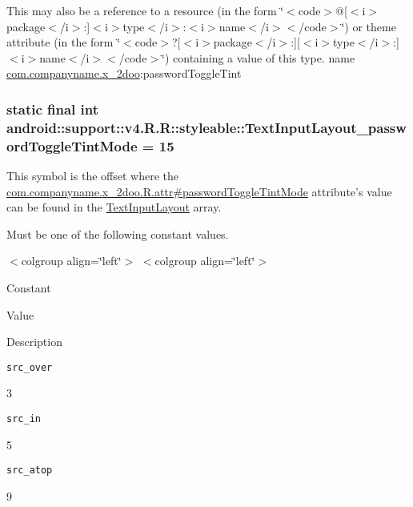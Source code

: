 This may also be a reference to a resource (in the form \char`\"{}$<$code$>$@\mbox{[}$<$i$>$package$<$/i$>$:\mbox{]}$<$i$>$type$<$/i$>$:$<$i$>$name$<$/i$>$$<$/code$>$\char`\"{}) or theme attribute (in the form \char`\"{}$<$code$>$?\mbox{[}$<$i$>$package$<$/i$>$:\mbox{]}\mbox{[}$<$i$>$type$<$/i$>$:\mbox{]}$<$i$>$name$<$/i$>$$<$/code$>$\char`\"{}) containing a value of this type.  name \hyperlink{namespacecom_1_1companyname_1_1x__2doo}{com.companyname.x\_\-2doo}:passwordToggleTint \hypertarget{classandroid_1_1support_1_1v4_1_1_r_1_1styleable_d9463181356179330f3502a4a7936e5a}{
\subsubsection[{TextInputLayout\_\-passwordToggleTintMode}]{\setlength{\rightskip}{0pt plus 5cm}static final int android::support::v4.R.R::styleable::TextInputLayout\_\-passwordToggleTintMode = 15}}
\label{classandroid_1_1support_1_1v4_1_1_r_1_1styleable_d9463181356179330f3502a4a7936e5a}


This symbol is the offset where the \hyperlink{classcom_1_1companyname_1_1x__2doo_1_1_r_1_1attr_930a88adb866b21f54f34838092a7d4f}{com.companyname.x\_\-2doo.R.attr\#passwordToggleTintMode} attribute's value can be found in the \hyperlink{classandroid_1_1support_1_1v4_1_1_r_1_1styleable_880beb171ce483ab1b63a82ef7f9d976}{TextInputLayout} array.

Must be one of the following constant values. \begin{TabularC}{0}
\hline
\end{TabularC}
$<$colgroup align=\char`\"{}left\char`\"{}$>$ $<$colgroup align=\char`\"{}left\char`\"{}$>$ 

Constant

Value

Description 

{\tt src\_\-over}

3

{\tt src\_\-in}

5

{\tt src\_\-atop}

9

